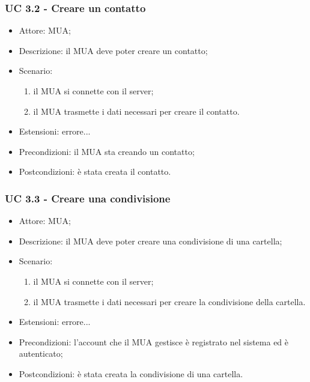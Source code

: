     \subsubsection{UC 3.2 - Creare un contatto} \label{sec: UC 3.2}
    \begin{itemize}
        \item Attore: MUA;
        \item Descrizione: il MUA deve poter creare un contatto;
        \item Scenario:
        \begin{enumerate}
        \item il MUA si connette con il server;
        \item il MUA trasmette i dati necessari per creare il contatto.
        \end{enumerate}
        \item Estensioni: errore...
        \item Precondizioni: il MUA sta creando un contatto;
        \item Postcondizioni: è stata creata il contatto.
    \end{itemize}

    \subsubsection{UC 3.3 - Creare una condivisione} \label{sec: UC 3.3}
    \begin{itemize}
        \item Attore: MUA;
        \item Descrizione: il MUA deve poter creare una condivisione di una cartella;
        \item Scenario:
        \begin{enumerate}
        \item il MUA si connette con il server;
        \item il MUA trasmette i dati necessari per creare la condivisione della cartella.
        \end{enumerate}
        \item Estensioni: errore...
        \item Precondizioni: l’account che il MUA gestisce è registrato nel sistema ed è autenticato;
        \item Postcondizioni: è stata creata la condivisione di una cartella.
    \end{itemize}

